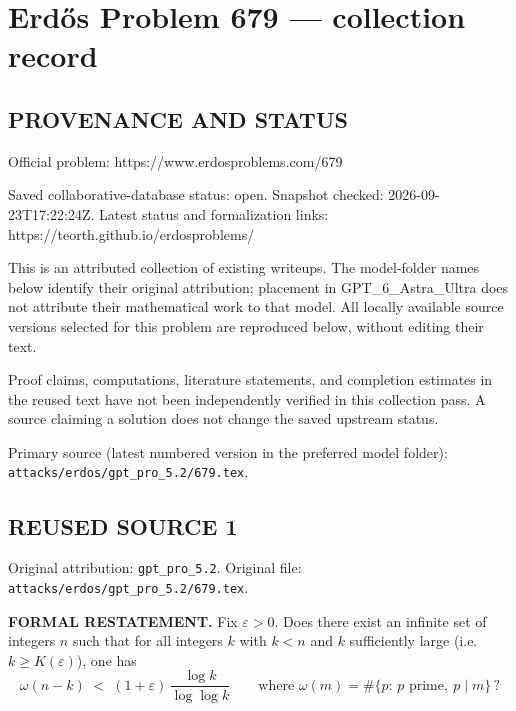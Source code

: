\section*{Erd\H{o}s Problem 679 --- collection record}

\subsection*{PROVENANCE AND STATUS}
Official problem: https://www.erdosproblems.com/679

Saved collaborative-database status: open.
Snapshot checked: 2026-09-23T17:22:24Z.
Latest status and formalization links: https://teorth.github.io/erdosproblems/

This is an attributed collection of existing writeups. The model-folder names below identify their original attribution; placement in GPT\_6\_Astra\_Ultra does not attribute their mathematical work to that model. All locally available source versions selected for this problem are reproduced below, without editing their text.

Proof claims, computations, literature statements, and completion estimates in the reused text have not been independently verified in this collection pass. A source claiming a solution does not change the saved upstream status.

Primary source (latest numbered version in the preferred model folder): \texttt{attacks/erdos/gpt\_pro\_5.2/679.tex}.

\subsection*{REUSED SOURCE 1}
Original attribution: \texttt{gpt\_pro\_5.2}.
Original file: \texttt{attacks/erdos/gpt\_pro\_5.2/679.tex}.

\item
\textbf{FORMAL RESTATEMENT.}
Fix $\varepsilon>0$. Does there exist an infinite set of integers $n$ such that for all integers $k$ with $k<n$ and $k$ sufficiently large (i.e. $k\ge K(\varepsilon)$), one has
\[
\omega(n-k)\;<\;(1+\varepsilon)\,\frac{\log k}{\log\log k}
\qquad\text{where }\omega(m)=\#\{p:\,p\text{ prime},\ p\mid m\}\,?
\]

